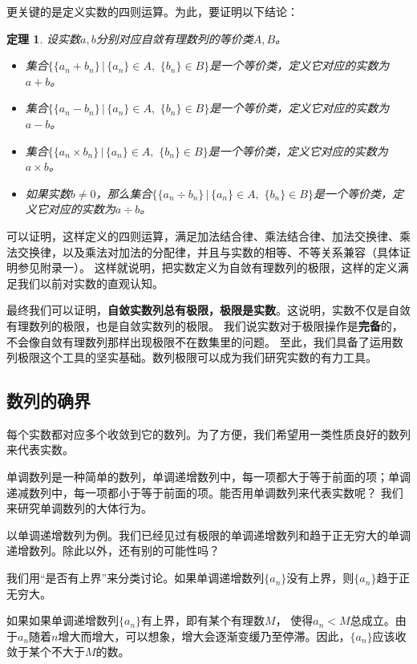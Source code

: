 \documentclass[12pt,UTF8]{ctexbook}
\newtheorem{tm}{定理}[section]
\begin{document}
更关键的是定义实数的四则运算。为此，要证明以下结论：
\begin{tm}
    设实数$a,b$分别对应自敛有理数列的等价类$A,B$。
    \begin{itemize}
        \item 集合$\{\{a_n + b_n\} \, | \, \{a_n\}\in A,\,\, \{b_n\}\in B\}$是一个等价类，定义它对应的实数为$a + b$。
        \item 集合$\{\{a_n - b_n\} \, | \, \{a_n\}\in A,\,\, \{b_n\}\in B\}$是一个等价类，定义它对应的实数为$a - b$。
        \item 集合$\{\{a_n \times b_n\} \, | \, \{a_n\}\in A,\,\, \{b_n\}\in B\}$是一个等价类，定义它对应的实数为$a \times b$。
        \item 如果实数$b\neq 0$，那么集合$\{\{a_n \div b_n\} \, | \, \{a_n\}\in A,\,\, \{b_n\}\in B\}$是一个等价类，定义它对应的实数为$a \div b$。
    \end{itemize}  
\end{tm}
可以证明，这样定义的四则运算，满足加法结合律、乘法结合律、加法交换律、乘法交换律，以及乘法对加法的分配律，并且与实数的相等、不等关系兼容（具体证明参见附录一）。
这样就说明，把实数定义为自敛有理数列的极限，这样的定义满足我们以前对实数的直观认知。

最终我们可以证明，\textbf{自敛实数列总有极限，极限是实数}。这说明，实数不仅是自敛有理数列的极限，也是自敛实数列的极限。
我们说实数对于极限操作是\textbf{完备}的，不会像自敛有理数列那样出现极限不在数集里的问题。
至此，我们具备了运用数列极限这个工具的坚实基础。数列极限可以成为我们研究实数的有力工具。

\subsection{数列的确界}
每个实数都对应多个收敛到它的数列。为了方便，我们希望用一类性质良好的数列来代表实数。

单调数列是一种简单的数列，单调递增数列中，每一项都大于等于前面的项；单调递减数列中，每一项都小于等于前面的项。能否用单调数列来代表实数呢？
我们来研究单调数列的大体行为。

以单调递增数列为例。我们已经见过有极限的单调递增数列和趋于正无穷大的单调递增数列。除此以外，还有别的可能性吗？

我们用“是否有上界”来分类讨论。如果单调递增数列$\{a_n\}$没有上界，则$\{a_n\}$趋于正无穷大。

如果如果单调递增数列$\{a_n\}$有上界，即有某个有理数$M$，
使得$a_n < M$总成立。由于$a_n$随着$n$增大而增大，可以想象，增大会逐渐变缓乃至停滞。因此，$\{a_n\}$应该收敛于某个不大于$M$的数。
\end{document}
